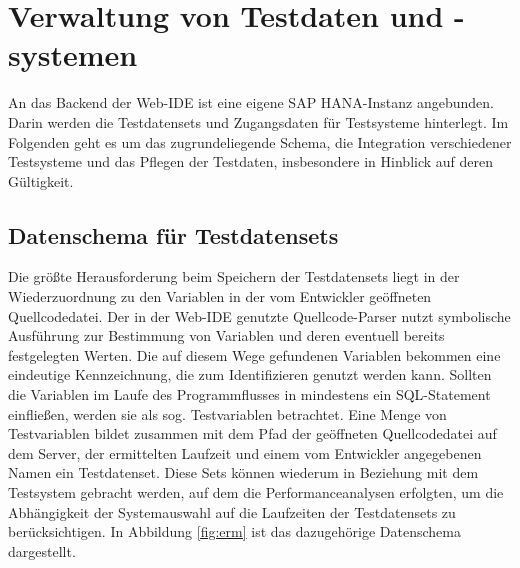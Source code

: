 \section{Verwaltung von Testdaten und -systemen}\label{chap:testdataadministration}

%
%

An das Backend der Web-IDE ist eine eigene SAP HANA-Instanz angebunden.
Darin werden die Testdatensets und Zugangsdaten für Testsysteme hinterlegt.
Im Folgenden geht es um das zugrundeliegende Schema, die Integration verschiedener Testsysteme und das Pflegen der Testdaten, insbesondere in Hinblick auf deren Gültigkeit.

\subsection{Datenschema für Testdatensets}
Die größte Herausforderung beim Speichern der Testdatensets liegt in der Wiederzuordnung zu den Variablen in der vom Entwickler geöffneten Quellcodedatei.
Der in der Web-IDE genutzte Quellcode-Parser \cite{Horschig2014} nutzt symbolische Ausführung \cite{DBLP:journals/cacm/King76} zur Bestimmung von Variablen und deren eventuell bereits festgelegten Werten.
Die auf diesem Wege gefundenen Variablen bekommen eine eindeutige Kennzeichnung, die zum Identifizieren genutzt werden kann.
Sollten die Variablen im Laufe des Programmflusses in mindestens ein SQL-Statement einfließen, werden sie als sog. Testvariablen betrachtet.
Eine Menge von Testvariablen bildet zusammen mit dem Pfad der geöffneten Quellcodedatei auf dem Server, der ermittelten Laufzeit und einem vom Entwickler angegebenen Namen ein Testdatenset.
Diese Sets können wiederum in Beziehung mit dem Testsystem gebracht werden, auf dem die Performanceanalysen erfolgten, um die Abhängigkeit der Systemauswahl auf die Laufzeiten der Testdatensets zu berücksichtigen.
In Abbildung \ref{fig:erm} ist das dazugehörige Datenschema dargestellt.

\newcommand {\key}[1]{\underline{#1}}

